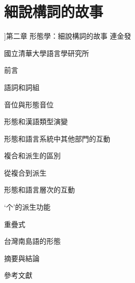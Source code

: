 
\chapter{細說構詞的故事}]{\rmfamily 第二章 形態學：細說構詞的故事}
\rmfamily
連金發

\rmfamily
國立清華大學語言學研究所

\begin{listWWviiiNumxleveli}
\item \begin{styleqwerty}\rmfamily
前言
\end{styleqwerty}
\item \begin{styleqwerty}\rmfamily
語詞和詞組
\end{styleqwerty}
\item \begin{styleqwerty}\rmfamily
音位與形態音位
\end{styleqwerty}
\item \begin{styleqwerty}\rmfamily
形態和漢語類型演變
\end{styleqwerty}
\item \begin{styleqwerty}\rmfamily
形態和語言系統中其他部門的互動
\end{styleqwerty}
\item \begin{styleqwerty}\rmfamily
複合和派生的區別
\end{styleqwerty}
\item \begin{styleqwerty}\rmfamily
從複合到派生
\end{styleqwerty}
\item \begin{styleqwerty}\rmfamily
形態和語言層次的互動
\end{styleqwerty}
\item \begin{styleqwerty}\rmfamily
‘个’的派生功能
\end{styleqwerty}
\item \begin{styleqwerty}\rmfamily
重疊式
\end{styleqwerty}
\item \begin{styleqwerty}\rmfamily
台灣南島語的形態
\end{styleqwerty}
\item \begin{styleqwerty}\rmfamily
摘要與結論
\end{styleqwerty}
\item \begin{styleqwerty}\rmfamily
參考文獻
\end{styleqwerty}
\end{listWWviiiNumxleveli}


